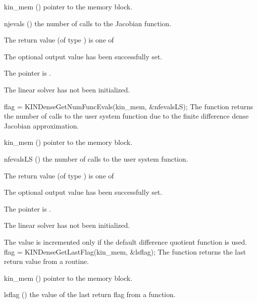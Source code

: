 {
  \begin{args}
  \item[kin\_mem] ()
    pointer to the {\kinsol} memory block.
  \item[njevals] ()
    the number of calls to the Jacobian function.
  \end{args}
}
{
  The return value  (of type ) is one of
  \begin{args}
  \item[\Id{KINDENSE\_SUCCESS}] 
    The optional output value has been successfully set.
  \item[\Id{KINDENSE\_MEM\_NULL}]
    The  pointer is .
  \item[\Id{KINDENSE\_LMEM\_NULL}]
    The {\kindense} linear solver has not been initialized.
  \end{args}
}
{}
{
  flag = KINDenseGetNumFuncEvals(kin\_mem, \&nfevalsLS);
}
{
  The function  returns the
  number of calls to the user system function due to the 
  finite difference dense Jacobian approximation.
}
{
  \begin{args}
  \item[kin\_mem] ()
    pointer to the {\kinsol} memory block.
  \item[nfevalsLS] ()
    the number of calls to the user system function.
  \end{args}
}
{
  The return value  (of type ) is one of
  \begin{args}
  \item[\Id{KINDENSE\_SUCCESS}] 
    The optional output value has been successfully set.
  \item[\Id{KINDENSE\_MEM\_NULL}]
    The  pointer is .
  \item[\Id{KINDENSE\_LMEM\_NULL}]
    The {\kindense} linear solver has not been initialized.
  \end{args}
}
{
  The value  is incremented only if the default 
   difference quotient function is used.
}
{
  flag = KINDenseGetLastFlag(kin\_mem, \&lsflag);
}
{
  The function  returns the
  last return value from a {\kindense} routine. 
}
{
  \begin{args}
  \item[kin\_mem] ()
    pointer to the {\kinsol} memory block.
  \item[lsflag] ()
    the value of the last return flag from a {\kindense} function.
  \end{args}
}
